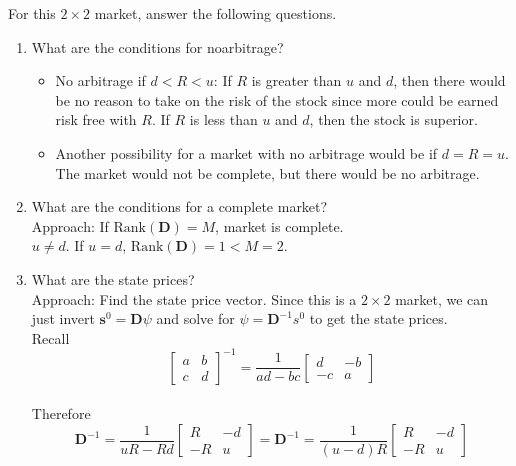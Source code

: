 \documentclass[11pt]{article}
\begin{document}
For this $2 \times 2$ market, answer the following questions.
\begin{enumerate}
        \item What are the conditions for noarbitrage?
        \begin{itemize}
            \item No arbitrage if $d < R < u$: If $R$ is greater than $u$ and $d$, then there 
            would be no reason to take on the risk of the stock since more could be earned risk 
            free with $R$. If $R$ is less than $u$ and $d$, then the stock is superior. 
            \item Another possibility for a market with no arbitrage would be if $d = R = u$. 
            The market would not be complete, but there would be no arbitrage.
        \end{itemize}
        \item What are the conditions for a complete market? \\
        Approach: If $\text{Rank}(\boldsymbol{D}) = M$, market is complete. \\

        $u \ne d$. If $u=d$, $\text{Rank}(\boldsymbol{D}) = 1 < M = 2$.
        \item What are the state prices? \\
        Approach: Find the state price vector. Since this is a $2 \times 2$ market, we can just 
        invert $\boldsymbol{s}^0 = \boldsymbol{D}\psi$ and solve for $\psi = 
        \boldsymbol{D}^{-1} s^0$ to get the state prices. \\
        
        Recall
        \[
        {\begin{bmatrix}
            a & b \\
            c & d 
        \end{bmatrix}}^{-1} = 
        \frac{1}{ad - bc} 
        \begin{bmatrix}
            d & -b \\ 
            -c & a
        \end{bmatrix}
        \] \\
        Therefore
        \[
        \boldsymbol{D}^{-1} = \frac{1}{uR - Rd} 
        \begin{bmatrix}
            R & - d \\ 
            -R & u
        \end{bmatrix} = 
        \boldsymbol{D}^{-1} = \frac{1}{(u - d)R} 
        \begin{bmatrix}
            R & - d \\ 
            -R & u
        \end{bmatrix}
        \]


\end{enumerate}
\end{document}
